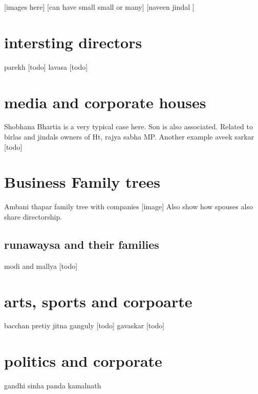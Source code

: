 [images here]
[can have small small or many]
[naveen jindal ]

\section{intersting directors}
parekh [todo]
lavasa [todo]

\section{media and corporate houses}
Shobhana Bhartia is a very typical case here. Son is also associated. Related to birlas and jindals owners of Ht, rajya sabha MP.
Another example aveek sarkar [todo] 

\section{Business Family trees}
Ambani
thapar family tree with companies [image]
Also show how spouses also share directorship.

\subsection{runawaysa and their families}
modi and mallya [todo]

\section{arts, sports and corpoarte}
bacchan
pretiy jitna
ganguly [todo]
gavaskar [todo]

\section{politics and corporate}
gandhi
sinha
panda
kamalnath

